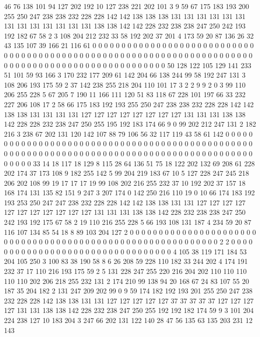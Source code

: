 46 76 138 101 94 127 202 192 10 127 238 221 202 101 3 9 59 67 175 183
193 200 255 250 247 238 238 232 228 228 142 142 138 138 138 131 131 131 131 131
131 131 131 131 131 131 131 131 138 138 142 142 228 232 238 238 247 250 242 193
192 182 67 58 2 3 108 204 212 232 33 58 192 202 37 201 4 173 59 20
87 136 26 32 43 135 107 39 166 21 116 61 0 0 0 0 0 0 0 0
0 0 0 0 0 0 0 0 0 0 0 0 0 0 0 0 0 0 0 0
0 0 0 0 0 0 0 0 0 0 0 0 0 0 0 0 0 0 0 0
0 0 0 0 0 0 0 0 0 0 0 0 0 0 0 0 0 0 0 0
0 0 0 0 0 0 0 0 0 0 0 0 0 0 0 0 0 0 0 0
0 0 0 0 0 0 0 0 0 0 0 50 128 122 105 129 141 233 51 101
59 93 166 3 170 232 177 209 61 142 204 66 138 244 99 58 192 247 131 3
108 206 193 175 59 2 37 142 238 255 218 204 110 101 17 3 2 2 9 9
2 0 3 99 110 206 255 228 5 67 205 7 190 11 166 111 120 51 83 118
67 228 101 197 66 33 232 227 206 108 17 2 58 66 175 183 192 193 255 250
247 238 238 232 228 228 142 142 138 138 131 131 131 131 127 127 127 127 127 127
127 127 131 131 131 138 138 142 228 228 232 238 247 250 255 195 192 183 174 66
9 0 99 202 212 247 131 2 182 216 3 238 67 202 131 120 142 107 88 79
106 56 32 117 119 43 58 61 142 0 0 0 0 0 0 0 0 0 0 0
0 0 0 0 0 0 0 0 0 0 0 0 0 0 0 0 0 0 0 0
0 0 0 0 0 0 0 0 0 0 0 0 0 0 0 0 0 0 0 0
0 0 0 0 0 0 0 0 0 0 0 0 0 0 0 0 0 0 0 0
0 0 0 0 0 0 0 0 0 0 0 0 0 0 0 0 0 0 0 0
0 0 0 0 0 33 14 18 117 18 129 8 115 28 64 136 51 75 18 122
202 132 69 208 61 228 202 174 37 173 108 9 182 255 142 5 99 204 219 183
67 10 5 127 228 247 245 218 206 202 108 99 19 17 17 17 19 99 108 202
216 255 232 37 10 192 202 37 157 18 168 174 131 135 82 151 9 247 3 207
174 0 142 250 216 110 19 0 10 66 174 183 192 193 253 250 247 247 238 232
228 228 142 142 138 138 131 131 127 127 127 127 127 127 127 127 127 127 127 131
131 131 138 138 142 228 232 238 238 247 250 242 193 192 175 67 58 2 19 110
216 255 228 5 66 193 108 131 187 4 234 59 20 87 116 107 134 85 54 18
8 89 103 204 127 2 0 0 0 0 0 0 0 0 0 0 0 0 0 0
0 0 0 0 0 0 0 0 0 0 0 0 0 0 0 0 0 0 0 0
0 0 0 0 0 0 0 0 0 0 0 0 0 0 0 0 0 0 0 0
0 0 0 0 0 2 2 0 0 0 0 0 0 0 0 0 0 0 0 0
0 0 0 0 0 0 0 0 0 0 0 0 0 0 0 0 0 0 0 0
4 105 38 119 171 184 53 204 105 250 3 100 83 38 190 58 8 6 26 208
59 228 110 182 33 244 202 4 174 191 232 37 17 110 216 193 175 59 2 5
131 228 247 255 220 216 204 202 110 110 110 110 110 202 206 218 255 232 131 2
174 210 99 138 94 20 168 67 24 83 107 55 20 187 35 204 182 2 131 247
209 202 99 0 9 59 174 182 192 193 201 255 250 247 238 232 228 228 142 138
138 131 131 127 127 127 127 127 37 37 37 37 37 127 127 127 127 131 131 138
138 142 228 232 238 247 250 255 192 192 182 174 59 9 3 101 204 224 238 127
10 183 204 3 247 66 202 131 122 140 28 47 56 135 63 135 203 231 12 143
